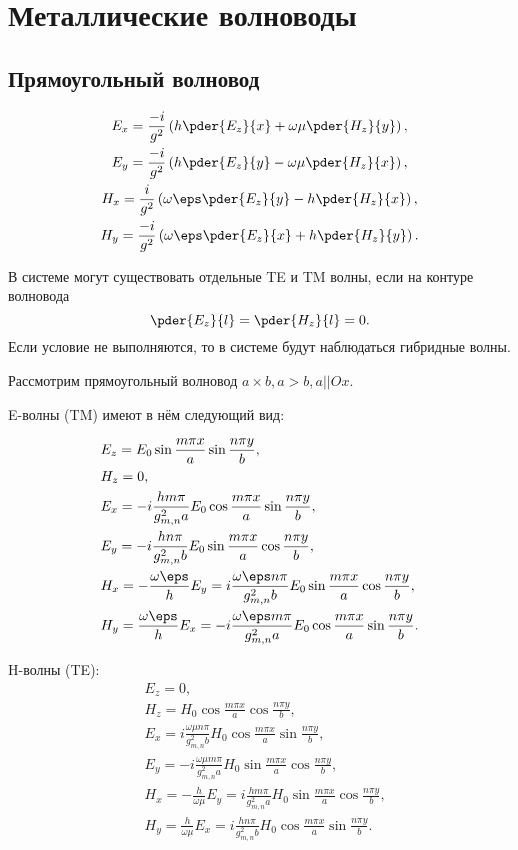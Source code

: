 \chapter{Металлические волноводы}
\section{Прямоугольный волновод}

\begin{gather*}
	E_x = \frac{-i}{g^2}\left(h\pder{E_z}{x} + \omega\mu\pder{H_z}{y}\right),\\
	E_y = \frac{-i}{g^2}\left(h\pder{E_z}{y} - \omega\mu\pder{H_z}{x}\right),\\
	H_x = \frac{i}{g^2}\left(\omega\eps\pder{E_z}{y} - h\pder{H_z}{x}\right),\\
	H_y = \frac{-i}{g^2}\left(\omega\eps\pder{E_z}{x} + h\pder{H_z}{y}\right).
\end{gather*}

В системе могут существовать отдельные TE и TM волны, если на контуре волновода
\[
	\pder{E_z}{l} = \pder{H_z}{l} = 0.
\]
Если условие не выполняются, то в системе будут наблюдаться гибридные волны.

Рассмотрим прямоугольный волновод \( a \times b, a > b, a || Ox \).

E-волны (TM) имеют в нём следующий вид:

\begin{align*}
	& E_z = E_0\sin\frac{m\pi x}{a}\sin\frac{n\pi y}{b},\\
	& H_z = 0,\\
	& E_x = -i\frac{hm\pi}{g_{m,n}^2a}E_0\cos\frac{m\pi x}{a}\sin\frac{n\pi y}{b},\\
	& E_y = -i\frac{hn\pi}{g_{m,n}^2b}E_0\sin\frac{m\pi x}{a}\cos\frac{n\pi y}{b},\\
	& H_x = -\frac{\omega\eps}{h}E_y = i\frac{\omega\eps n\pi}{g_{m,n}^2b}E_0
	 								\sin\frac{m\pi x}{a}\cos\frac{n\pi y}{b},\\
	& H_y = \frac{\omega\eps}{h}E_x = -i\frac{\omega\eps m\pi}{g_{m,n}^2a}E_0
	 								\cos\frac{m\pi x}{a}\sin\frac{n\pi y}{b}.
\end{align*}

H-волны (TE):
\begin{align*}
	& E_z = 0,\\
	& H_z = H_0\cos\frac{m\pi x}{a}\cos\frac{n\pi y}{b},\\
	& E_x = i\frac{\omega\mu n\pi}{g_{m,n}^2b}H_0\cos\frac{m\pi x}{a}\sin\frac{n\pi y}{b},\\
	& E_y = -i\frac{\omega\mu m\pi}{g_{m,n}^2a}H_0\sin\frac{m\pi x}{a}\cos\frac{n\pi y}{b},\\
	& H_x = -\frac{h}{\omega\mu}E_y = i\frac{hm\pi}{g_{m,n}^2a}H_0
	 								\sin\frac{m\pi x}{a}\cos\frac{n\pi y}{b},\\
	& H_y = \frac{h}{\omega\mu}E_x = i\frac{h n\pi}{g_{m,n}^2b}H_0
	 								\cos\frac{m\pi x}{a}\sin\frac{n\pi y}{b}.
\end{align*}

